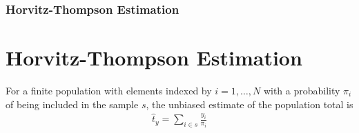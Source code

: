 \documentclass{beamer}
\begin{document}
%
\begin{frame}
  \frametitle{Horvitz-Thompson Estimation}
  \section{Horvitz-Thompson Estimation}
  For a finite population with elements indexed by $i = 1, \ldots, N$ with a probability $\pi_i$ of being included in the sample $s$, the unbiased estimate of the population total is 
  \begin{align*}
    \hat{t}_y = \sum_{i \in s} \frac{y_i} {\pi_i}
  \end{align*}
\end{frame}



%
\end{document}
